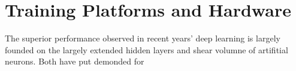 \section{Training Platforms and Hardware}
The superior performance observed in recent years' deep learning is largely founded on the largely extended hidden layers and shear volumne of artifitial neurons. Both have put demonded for 